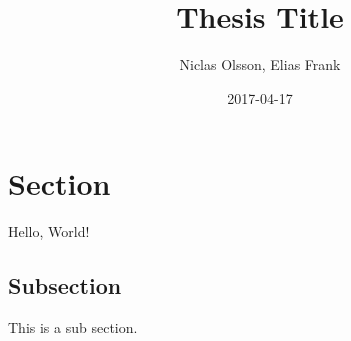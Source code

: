 \documentclass{article}
\title{Thesis Title}
\date{2017-04-17}
\author{Niclas Olsson, Elias Frank}
\begin{document}
	\maketitle
	\newpage
	
	\tableofcontents
	\newpage
	
	
	\section{Section}
	Hello, World!
	
	\subsection{Subsection}
	This is a sub section.\cite{DummyCitation}
	
	\newpage
	
	
\end{document}
